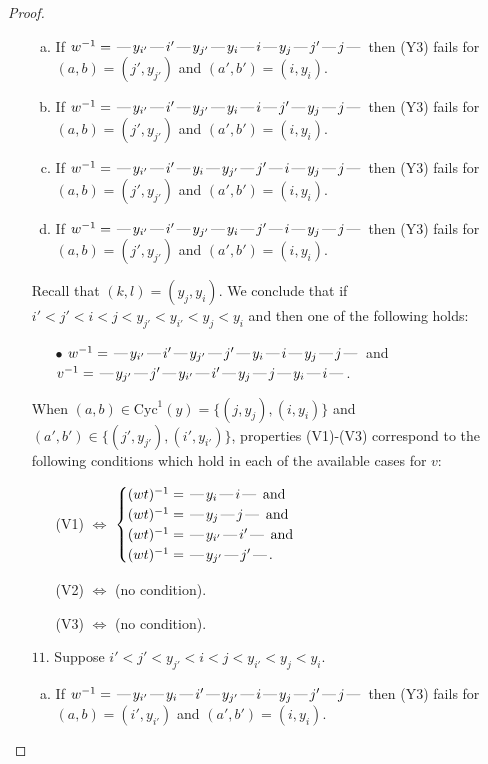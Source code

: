 \documentclass[10pt]{article}
\theoremstyle{definition}
\theoremstyle{definition}
\def\dash{\text{\hspace{0.5mm}---\hspace{0.5mm}}}
\def\Cyc{\mathrm{Cyc}}
\begin{document}
\begin{proof}
\begin{enumerate}
\begin{enumerate}[(a)]
\item If $w^{-1} = \dash y_{i'}\dash i'\dash y_{j'}\dash y_i\dash i\dash y_j\dash j'\dash j\dash $ then (Y3) fails for $(a,b)=(j',y_{j'})$ and $(a',b')=(i,y_i)$.
\item If $w^{-1} = \dash y_{i'}\dash i'\dash y_{j'}\dash y_i\dash i\dash j'\dash y_j\dash j\dash $ then (Y3) fails for $(a,b)=(j',y_{j'})$ and $(a',b')=(i,y_i)$.
\item If $w^{-1} = \dash y_{i'}\dash i'\dash y_i\dash y_{j'}\dash j'\dash i\dash y_j\dash j\dash $ then (Y3) fails for $(a,b)=(j',y_{j'})$ and $(a',b')=(i,y_i)$.
\item If $w^{-1} = \dash y_{i'}\dash i'\dash y_{j'}\dash y_i\dash j'\dash i\dash y_j\dash j\dash $ then (Y3) fails for $(a,b)=(j',y_{j'})$ and $(a',b')=(i,y_i)$.
\end{enumerate}
Recall that $(k,l) = (y_j,y_i)$.
We conclude that if $i' < j' < i < j < y_{j'} < y_{i'} < y_j < y_i$ and then one of the following holds:
\begin{enumerate}
\item[$\bullet$] $w^{-1} = \dash y_{i'}\dash i'\dash y_{j'}\dash j'\dash y_i\dash i\dash y_j\dash j\dash $ and $v^{-1} = \dash y_{j'}\dash j'\dash y_{i'}\dash i'\dash y_j\dash j\dash y_i\dash i\dash $.
\end{enumerate}
When $(a,b)\in\Cyc^1(y)=\{(j,y_j),(i,y_i)\}$ and $(a',b')\in\{(j',y_{j'}),(i',y_{i'})\}$,
properties (V1)-(V3) correspond to the following conditions which hold in
each of the available cases for $v$:
\begin{enumerate}
\item[](V1) $\Leftrightarrow$ $\begin{cases}\text{$(wt)^{-1} = \dash y_i \dash i \dash$}\text{ and }\\
\text{$(wt)^{-1} = \dash y_j \dash j \dash$}\text{ and }\\
\text{$(wt)^{-1} = \dash y_{i'} \dash i' \dash$}\text{ and }\\
\text{$(wt)^{-1} = \dash y_{j'} \dash j' \dash$}.\end{cases}$
\item[](V2) $\Leftrightarrow$ (no condition).
\item[](V3) $\Leftrightarrow$ (no condition).
\end{enumerate}
\item[$11$.] Suppose $i' < j' < y_{j'} < i < j < y_{i'} < y_j < y_i$.
\begin{enumerate}[(a)]
\item If $w^{-1} = \dash y_{i'}\dash y_i\dash i'\dash y_{j'}\dash i\dash y_j\dash j'\dash j\dash $ then (Y3) fails for $(a,b)=(i',y_{i'})$ and $(a',b')=(i,y_i)$.

\end{enumerate}
\end{enumerate}
\end{proof}
\end{document}
